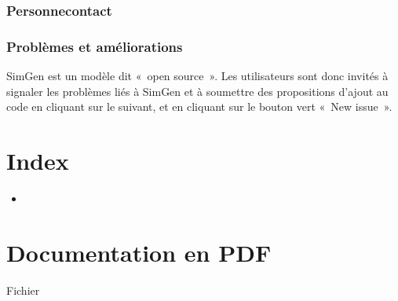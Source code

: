 \documentclass[letterpaper,10pt,french]{sphinxmanual}
\begin{document}
\subsection{Personne\sphinxhyphen{}contact}
\label{\detokenize{credits:personne-contact}}


\subsection{Problèmes et améliorations}
\label{\detokenize{credits:problemes-et-ameliorations}}
SimGen est un modèle dit « open source ». Les utilisateurs sont donc invités à signaler les problèmes liés à SimGen et à soumettre des propositions d’ajout au code
en cliquant sur le  suivant, et en cliquant sur le bouton vert « New issue ».


\chapter{Index}
\label{\detokenize{index:index}}\begin{itemize}
\item {} 

\end{itemize}


\chapter{Documentation en PDF}
\label{\detokenize{index:documentation-en-pdf}}
Fichier 


\renewcommand{\indexname}{Index des modules Python}
\begin{sphinxtheindex}
\let\bigletter\sphinxstyleindexlettergroup
\bigletter{s}
\item\relax{}
\end{sphinxtheindex}

\renewcommand{\indexname}{Index}
\printindex
\end{document}
